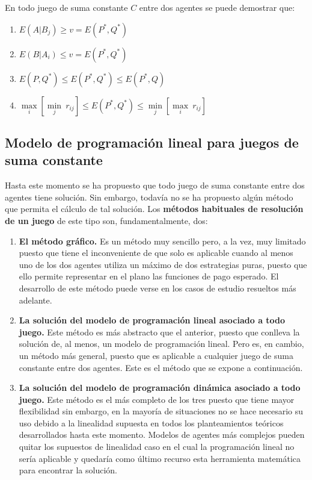 En todo  juego de suma constante $C$ entre dos agentes se puede demostrar que:
\begin{enumerate}
    \item $E(A|B_j) \geq v=E(P^*,Q^*)$
    \item $E(B|A_i) \leq v= E(P^*,Q^*)$
    \item $E(P,Q^*) \leq E(P^*,Q^*) \leq E(P^*,Q)$
    \item $\underset{i}{\max}\left[ \underset{j}{\min} \: r_{ij} \right]  \leq E(P^*,Q^*) \leq \underset{j}{\min}\left[ \underset{i}{\max} \: r_{ij} \right]$
\end{enumerate}


\subsection{Modelo de programación lineal para juegos de suma constante}

Hasta este momento se ha propuesto que todo juego de suma constante entre dos agentes tiene solución. Sin embargo, todavía no se ha propuesto algún método que permita el cálculo de tal solución. Los \textbf{métodos habituales de resolución de un juego} de este tipo son, fundamentalmente, dos:

\begin{enumerate}
    \item \textbf{El método gráfico.} Es un método muy  sencillo pero, a la vez, muy limitado puesto que tiene el inconveniente de que solo es aplicable cuando al menos uno de los dos agentes utiliza un máximo de dos estrategias puras, puesto que ello permite representar en el plano las funciones de pago esperado. El desarrollo de este método puede verse en los casos de estudio resueltos más adelante.
    \item \textbf{La solución del modelo de programación lineal asociado a todo juego.} Este método es más abstracto que el anterior, puesto que conlleva la solución de, al menos, un modelo de programación lineal. Pero es, en cambio, un método más general, puesto que es aplicable a cualquier juego de suma constante entre dos agentes. Este es el método que se expone  a continuación.
    \item \textbf{La solución del modelo de programación dinámica asociado a todo juego.} Este método es el más completo de los tres puesto que tiene mayor flexibilidad sin embargo, en la mayoría de situaciones no se hace necesario su uso debido a la linealidad supuesta en todos los planteamientos teóricos desarrollados hasta este momento.  Modelos de agentes más complejos pueden quitar los supuestos de linealidad caso en el cual la programación lineal no sería aplicable y quedaría como último recurso esta herramienta matemática para encontrar la solución.
\end{enumerate}

